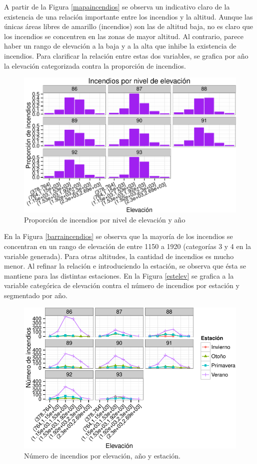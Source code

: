 \documentclass[12,]{article}
\begin{document}
A partir de la Figura \ref{mapaincendios} se observa un indicativo claro
de la existencia de una relación importante entre los incendios y la
altitud. Aunque las únicas áreas libres de amarillo (incendios) son las
de altitud baja, no es claro que los incendios se concentren en las
zonas de mayor altitud. Al contrario, parece haber un rango de elevación
a la baja y a la alta que inhibe la existencia de incendios. Para
clarificar la relación entre estas dos variables, se grafica por año la
elevación categorizada contra la proporción de incendios.

\begin{figure}[htbp]
\centering
\includegraphics{tarea2_files/figure-latex/unnamed-chunk-3-1.pdf}
\caption{Proporción de incendios por nivel de elevación y año
$\label{barraincendios}$}
\end{figure}

En la Figura \ref{barraincendios} se observa que la mayoría de los
incendios se concentran en un rango de elevación de entre 1150 a 1920
(categorías 3 y 4 en la variable generada). Para otras altitudes, la
cantidad de incendios es mucho menor. Al refinar la relación e
introduciendo la estación, se observa que ésta se mantiene para las
distintas estaciones. En la Figura \ref{estelev} se grafica a la
variable categórica de elevación contra el número de incendios por
estación y segmentado por año.

\begin{figure}[htbp]
\centering
\includegraphics{tarea2_files/figure-latex/unnamed-chunk-4-1.pdf}
\caption{Número de incendios por elevación, año y estación.
$\label{estelev}$}
\end{figure}
\end{document}
